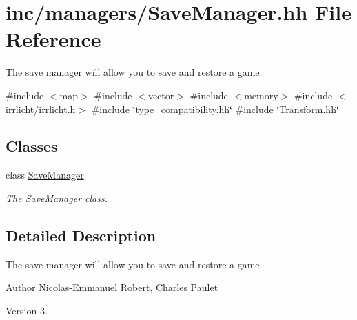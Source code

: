 \hypertarget{SaveManager_8hh}{}\section{inc/managers/\+Save\+Manager.hh File Reference}
\label{SaveManager_8hh}


The save manager will allow you to save and restore a game.  


{\ttfamily \#include $<$map$>$}\newline
{\ttfamily \#include $<$vector$>$}\newline
{\ttfamily \#include $<$memory$>$}\newline
{\ttfamily \#include $<$irrlicht/irrlicht.\+h$>$}\newline
{\ttfamily \#include \char`\"{}type\+\_\+compatibility.\+hh\char`\"{}}\newline
{\ttfamily \#include \char`\"{}Transform.\+hh\char`\"{}}\newline
\subsection*{Classes}
\begin{DoxyCompactItemize}
\item 
class \hyperlink{classSaveManager}{Save\+Manager}
\begin{DoxyCompactList}\small\item\em The \hyperlink{classSaveManager}{Save\+Manager} class. \end{DoxyCompactList}\end{DoxyCompactItemize}


\subsection{Detailed Description}
The save manager will allow you to save and restore a game. 

\begin{DoxyAuthor}{Author}
Nicolas-\/\+Emmanuel Robert, Charles Paulet 
\end{DoxyAuthor}
\begin{DoxyVersion}{Version}
3. 
\end{DoxyVersion}
